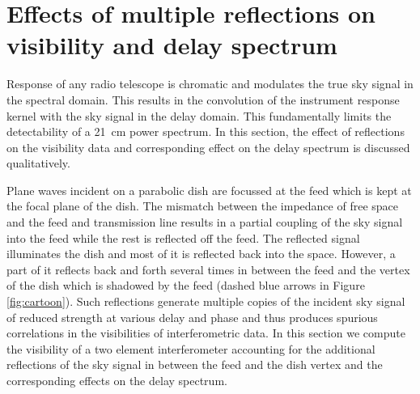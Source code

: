 \documentclass[iop]{emulateapj}
\begin{document}


\section{Effects of multiple reflections on visibility and delay spectrum}
Response of any radio telescope is chromatic and modulates the true sky signal in the spectral domain. This results in the convolution of the instrument response kernel with the sky signal in the delay domain.
This fundamentally limits the detectability of a 21~cm power spectrum. In this section, the effect of reflections on the visibility data and corresponding effect on the delay spectrum is discussed qualitatively.
 
 Plane waves incident on a parabolic dish are focussed at the feed which is kept at the focal plane of the dish.
The mismatch between the impedance of free space and the feed and transmission line results in a partial coupling of the sky signal into the feed while the rest is reflected off the feed. 
The reflected signal illuminates the dish and most of it is reflected back into the space.
However, a part of it reflects back and forth several times in between the feed and the vertex of the dish which is shadowed by the feed (dashed blue arrows in Figure \ref{fig:cartoon}).
Such reflections generate multiple copies of the incident sky signal of reduced strength at various delay and phase and thus produces spurious correlations in the visibilities of interferometric data. 
In this section we compute the visibility of a two element interferometer accounting for the additional reflections of the sky signal in between the feed and the dish vertex and the corresponding effects on the delay spectrum. 
\end{document}
